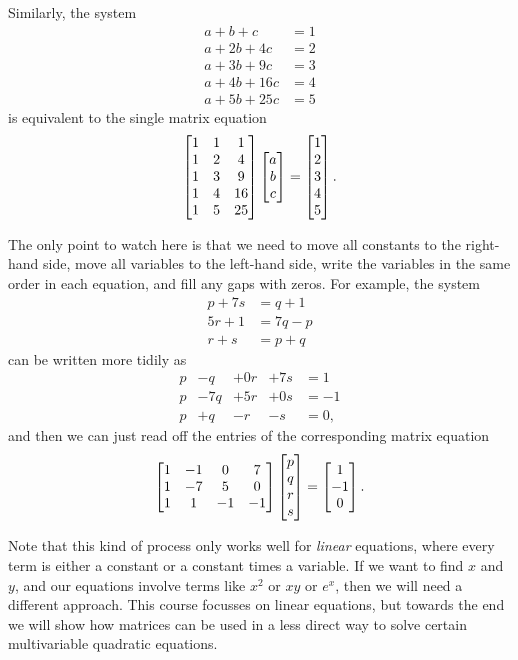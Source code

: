 \documentclass[reqno]{amsart}
\theoremstyle{definition}
\begin{document}
Similarly, the system
\begin{align*}
 a +  b +  c  &= 1 \\
 a + 2b + 4c  &= 2 \\
 a + 3b + 9c  &= 3 \\
 a + 4b + 16c &= 4 \\
 a + 5b + 25c &= 5
\end{align*}
is equivalent to the single matrix equation
\[ \left[\begin{matrix} 1 & 1 &  1 \\
        1 & 2 &  4 \\
        1 & 3 &  9 \\
        1 & 4 & 16 \\
        1 & 5 & 25 \end{matrix}\right]
   \left[\begin{matrix} a \\ b \\ c \end{matrix}\right] =
   \left[\begin{matrix} 1 \\ 2 \\ 3 \\ 4 \\ 5 \end{matrix}\right].
\]

The only point to watch here is that we need to move all constants to
the right-hand side, move all variables to the left-hand side, write
the variables in the same order in each equation, and fill any gaps
with zeros.  For example, the system
\begin{align*}
 p+7s &= q+1 \\
 5r+1 &= 7q-p \\
 r+s &= p+q
\end{align*}
can be written more tidily as
\[ \begin{array}{rrrrl}
 p & -q  & +0r & +7s &= 1 \\
 p & -7q & +5r & +0s &= -1 \\
 p & +q  & -r  & -s  &= 0,
\end{array} \]
and then we can just read off the entries of the corresponding matrix
equation
\[ \left[\begin{matrix} 1 & -1 & 0 & 7 \\ 1 & -7 & 5 & 0 \\ 1 & 1 & -1 & -1 \end{matrix}\right]
    \left[\begin{matrix} p \\ q \\ r \\ s \end{matrix}\right] = \left[\begin{matrix} 1 \\ -1 \\ 0 \end{matrix}\right].
\]

Note that this kind of process only works well for \emph{linear}
equations, where every term is either a constant or a constant times a
variable.  If we want to find $x$ and $y$, and our equations involve
terms like $x^2$ or $xy$ or $e^x$, then we will need a different
approach.  This course focusses on linear equations, but towards the
end we will show how matrices can be used in a less direct way to
solve certain multivariable quadratic equations.
\end{document}
